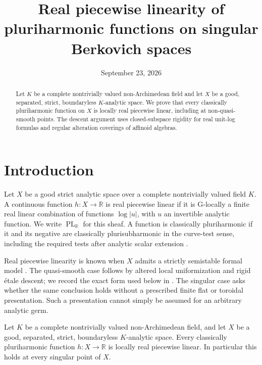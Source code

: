 \documentclass[11pt,a4paper]{amsart}
\title{Real piecewise linearity of pluriharmonic functions on singular Berkovich spaces}
\author{}
\date{September 23, 2026}
\begin{document}
\begin{abstract}
Let $K$ be a complete nontrivially valued non-Archimedean field and let $X$ be a good, separated, strict, boundaryless $K$-analytic space. We prove that every classically pluriharmonic function on $X$ is locally real piecewise linear, including at non-quasi-smooth points. The descent argument uses closed-subspace rigidity for real unit-log formulas and regular alteration coverings of affinoid algebras.
\end{abstract}

\maketitle

\section{Introduction}\label{sec:introduction}

Let $X$ be a good strict analytic space over a complete nontrivially valued field $K$. A continuous function $h:X\to\mathbb R$ is real piecewise linear if it is G-locally a finite real linear combination of functions $\log|u|$, with $u$ an invertible analytic function. We write $\operatorname{PL}_{\mathbb R}$ for this sheaf. A function is classically pluriharmonic if it and its negative are classically plurisubharmonic in the curve-test sense, including the required tests after analytic scalar extension \cite[Definition~7.1]{GR25Classical}.

Real piecewise linearity is known when $X$ admits a strictly semistable formal model \cite[Proposition~7.8]{GR25Classical}. The quasi-smooth case follows by altered local uniformization and rigid \'{e}tale descent; we record the exact form used below in . The singular case asks whether the same conclusion holds without a prescribed finite flat or toroidal presentation. Such a presentation cannot simply be assumed for an arbitrary analytic germ.

\begin{maintheorem}\label{thm:singular-pluriharmonic}
Let $K$ be a complete nontrivially valued non-Archimedean field, and let $X$ be a good, separated, strict, boundaryless $K$-analytic space. Every classically pluriharmonic function $h:X\to\mathbb R$ is locally real piecewise linear. In particular this holds at every singular point of $X$.
\end{maintheorem}
\end{document}
